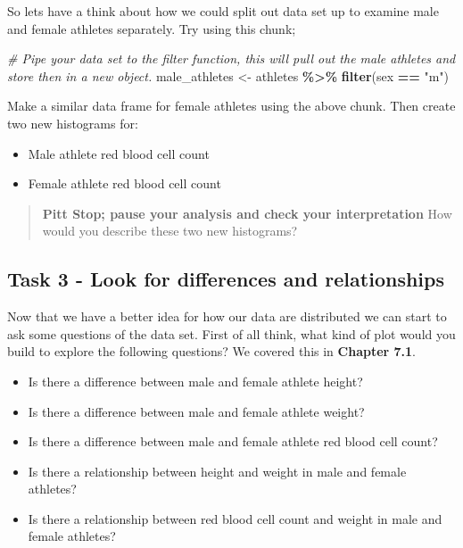 \documentclass[
]{book}
\newenvironment{Shaded}{\begin{snugshade}}{\end{snugshade}}
\newcommand{\CommentTok}[1]{\textcolor[rgb]{0.56,0.35,0.01}{\textit{#1}}}
\newcommand{\FunctionTok}[1]{\textcolor[rgb]{0.13,0.29,0.53}{\textbf{#1}}}
\newcommand{\NormalTok}[1]{#1}
\newcommand{\OtherTok}[1]{\textcolor[rgb]{0.56,0.35,0.01}{#1}}
\newcommand{\SpecialCharTok}[1]{\textcolor[rgb]{0.81,0.36,0.00}{\textbf{#1}}}
\newcommand{\StringTok}[1]{\textcolor[rgb]{0.31,0.60,0.02}{#1}}
\providecommand{\tightlist}{%
  \setlength{\itemsep}{0pt}\setlength{\parskip}{0pt}}
\begin{document}
So lets have a think about how we could split out data set up to examine male and female athletes separately. Try using this chunk;

\begin{Shaded}
\begin{Highlighting}[]
\CommentTok{\# Pipe your data set to the filter function, this will pull out the male athletes and store then in a new object.}
\NormalTok{male\_athletes }\OtherTok{\textless{}{-}}\NormalTok{ athletes }\SpecialCharTok{\%\textgreater{}\%}
  \FunctionTok{filter}\NormalTok{(sex }\SpecialCharTok{==} \StringTok{"m"}\NormalTok{)}
\end{Highlighting}
\end{Shaded}

Make a similar data frame for female athletes using the above chunk. Then create two new histograms for:

\begin{itemize}
\tightlist
\item
  Male athlete red blood cell count
\item
  Female athlete red blood cell count
\end{itemize}

\begin{quote}
\textbf{Pitt Stop; pause your analysis and check your interpretation}
How would you describe these two new histograms?
\end{quote}

\hypertarget{task-3---look-for-differences-and-relationships}{%
\subsection{Task 3 - Look for differences and relationships}\label{task-3---look-for-differences-and-relationships}}

Now that we have a better idea for how our data are distributed we can start to ask some questions of the data set. First of all think, what kind of plot would you build to explore the following questions? We covered this in \textbf{Chapter 7.1}.

\begin{itemize}
\tightlist
\item
  Is there a difference between male and female athlete height?
\item
  Is there a difference between male and female athlete weight?
\item
  Is there a difference between male and female athlete red blood cell count?
\item
  Is there a relationship between height and weight in male and female athletes?
\item
  Is there a relationship between red blood cell count and weight in male and female athletes?
\end{itemize}
\end{document}
